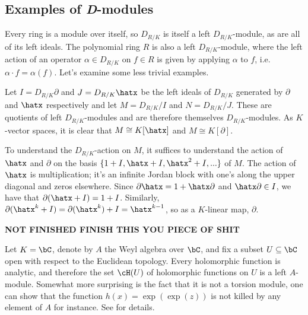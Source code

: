 \subsection{Examples of \emph{D}-modules}
Every ring is a module over itself, so $D_{R/K}$ is itself a left $D_{R/K}$-module, as are all of its left ideals. The polynomial ring $R$ is also a left $D_{R/K}$-module, where the left action of an operator $\alpha \in D_{R/K}$ on $f \in R$ is given by applying $\alpha$ to $f$, i.e. $\alpha\cdot f = \alpha(f)$. Let's examine some less trivial examples. 

\begin{example}\label{example:quotient-by-x-and-partial}
	Let $I = D_{R/K}\partial$ and $J = D_{R/K}\hatx$ be the left ideals of $D_{R/K}$ generated by $\partial$ and $\hatx$ respectively and let $M = D_{R/K}/I$ and $N = D_{R/K}/J$. These are quotients of left $D_{R/K}$-modules and are therefore themselves $D_{R/K}$-modules. As $K$-vector spaces, it is clear that $M \cong K[\hatx]$ and $M \cong K[\partial]$.

	To understand the $D_{R/K}$-action on $M$, it suffices to understand the action of $\hatx$ and $\partial$ on the basis $\{1+I,\hatx + I,\hatx^2 + I,...\}$ of $M$. The action of $\hatx$ is multiplication; it's an infinite Jordan block with one's along the upper diagonal and zeros elsewhere. Since $\partial\hatx = 1 + \hatx\partial$ and $\hatx\partial \in I$, we have that $\partial(\hatx + I) = 1 + I$. Similarly, $\partial(\hatx^k + I) = \partial(\hatx^k) + I = \hatx^{k-1}$, so as a $K$-linear map, $\partial$.

	\textbf{NOT FINISHED FINISH THIS YOU PIECE OF SHIT}
\end{example}
\begin{example}\label{example:holomorphic-functions}
	Let $K = \bC$, denote by $A$ the Weyl algebra over $\bC$, and fix a subset $U \subseteq \bC$ open with respect to the Euclidean topology. Every holomorphic function is analytic, and therefore the set $\cH(U)$ of holomorphic functions on $U$ is a left $A$-module. Somewhat more surprising is the fact that it is not a torsion module, one can show that the function $h(x) = \exp(\exp(z))$ is not killed by any element of $A$ for instance. See \cite[Chapter 5.3]{d-mod-primer} for details.
\end{example}
